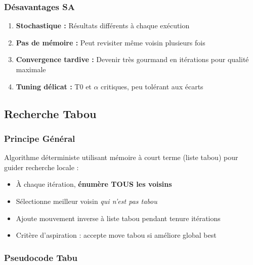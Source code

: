\documentclass[12pt,a4paper,twoside]{report}
\begin{document}
\subsubsection{Désavantages SA}

\begin{enumerate}
    \item \textbf{Stochastique :} Résultats différents à chaque exécution
    \item \textbf{Pas de mémoire :} Peut revisiter même voisin plusieurs fois
    \item \textbf{Convergence tardive :} Devenir très gourmand en itérations pour qualité maximale
    \item \textbf{Tuning délicat :} T0 et $\alpha$ critiques, peu tolérant aux écarts
\end{enumerate}

\subsection{Recherche Tabou}

\subsubsection{Principe Général}

Algorithme déterministe utilisant mémoire à court terme (liste tabou) pour
guider recherche locale :

\begin{itemize}
    \item À chaque itération, \textbf{énumère TOUS les voisins}
    \item Sélectionne meilleur voisin \textit{qui n'est pas tabou}
    \item Ajoute mouvement inverse à liste tabou pendant tenure itérations
    \item Critère d'aspiration : accepte move tabou si améliore global best
\end{itemize}

\subsubsection{Pseudocode Tabu}
\end{document}
